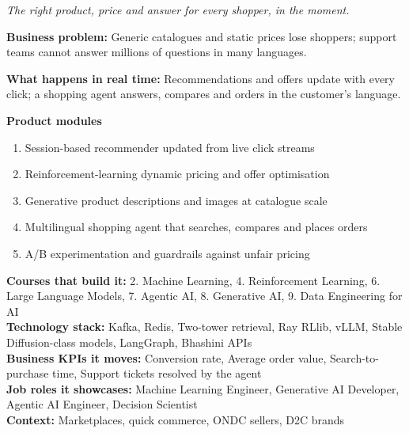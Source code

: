 \documentclass[10pt,a4paper]{article}
\begin{document}
\begin{tcolorbox}[enhanced,breakable,colback=white,colframe=navy,boxrule=0.6pt,arc=2pt,title={\color{goldl}PRODUCT 4 \;|\; RETAIL \& E-COMMERCE\\\color{white}\large Real-Time Personalisation \& Conversational Commerce Engine},colbacktitle=navy,fonttitle=\small\bfseries]
{\small\itshape\color{muted}The right product, price and answer for every shopper, in the moment.}\par
\begin{tcolorbox}[colback=l1bg,colframe=l1bg,arc=2pt,borderline west={3pt}{0pt}{saffron},top=2pt,bottom=2pt]\small\textbf{Business problem:} Generic catalogues and static prices lose shoppers; support teams cannot answer millions of questions in many languages.\end{tcolorbox}
\begin{tcolorbox}[colback=l3bg,colframe=l3bg,arc=2pt,borderline west={3pt}{0pt}{igreen},top=2pt,bottom=2pt]\small\textbf{What happens in real time:} Recommendations and offers update with every click; a shopping agent answers, compares and orders in the customer's language.\end{tcolorbox}
{\small\textbf{Product modules}}\begin{enumerate}\small
\item Session-based recommender updated from live click streams
\item Reinforcement-learning dynamic pricing and offer optimisation
\item Generative product descriptions and images at catalogue scale
\item Multilingual shopping agent that searches, compares and places orders
\item A/B experimentation and guardrails against unfair pricing
\end{enumerate}
{\small\textbf{Courses that build it:} 2. Machine Learning, 4. Reinforcement Learning, 6. Large Language Models, 7. Agentic AI, 8. Generative AI, 9. Data Engineering for AI\\\textbf{Technology stack:} Kafka, Redis, Two-tower retrieval, Ray RLlib, vLLM, Stable Diffusion-class models, LangGraph, Bhashini APIs\\\textbf{Business KPIs it moves:} Conversion rate, Average order value, Search-to-purchase time, Support tickets resolved by the agent\\\textbf{Job roles it showcases:} Machine Learning Engineer, Generative AI Developer, Agentic AI Engineer, Decision Scientist\\\textbf{Context:} Marketplaces, quick commerce, ONDC sellers, D2C brands}
\end{tcolorbox}
\end{document}
